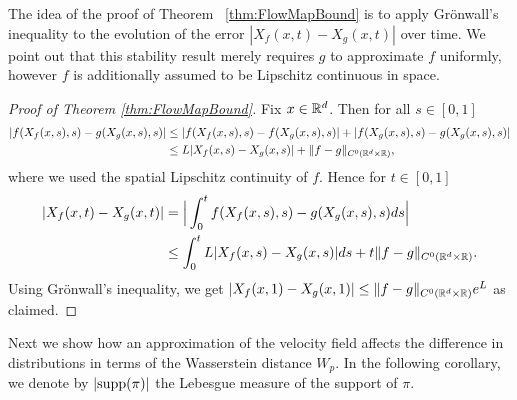 The idea of the proof of Theorem ~\ref{thm:FlowMapBound} is to apply
Gr\"onwall's inequality to the evolution of the error
$|X_f(x,t) - X_g(x,t)|$ over time. We point out that this stability result
merely requires $g$ to approximate $f$ uniformly, however $f$ is
additionally assumed to be Lipschitz continuous in space. 
\begin{proof}[Proof of Theorem \ref{thm:FlowMapBound}]
Fix $x\in\mathbb{R}^d$. Then for all $s\in [0,1]$
\begin{align*}
|f(X_f(x,s),s) - g(X_g(x,s),s)| &\le |f(X_f(x,s),s) - f(X_g(x,s), s)| + |f(X_g(x,s), s) - g(X_g(x,s),s)|\\
                                                  &\le L|X_f(x,s)-X_g(x,s)|+\|f-g\|_{C^0(\mathbb{R}^d\times\mathbb{R})},
\end{align*}
where we used the spatial Lipschitz continuity of $f$. Hence for $t\in [0,1]$
\begin{align*}
|X_f(x,t) - X_g(x,t)| &= \Big|\int_0^tf(X_f(x,s),s) - g(X_g(x,s),s)ds\Big|\\
&\le \int_0^tL|X_f(x,s)-X_g(x,s)|ds+t\|f-g\|_{C^0(\mathbb{R}^d\times\mathbb{R})}.
\end{align*}
Using Gr\"onwall's inequality, we get $|X_f(x,1) - X_g(x,1)|\leq \|f-g\|_{C^0(\mathbb{R}^d\times\mathbb{R})} e^{L}$
as claimed.
\end{proof}


Next we show how an approximation of the velocity field
affects the difference in distributions in terms of
the Wasserstein distance $W_p$. In the following
corollary, we denote by $|{\rm supp}(\pi)|$ the Lebesgue measure
of the support of $\pi$.

